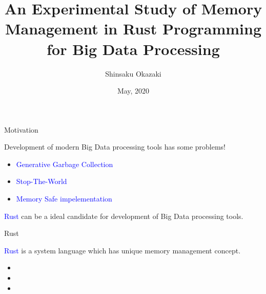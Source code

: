 \documentclass[9pt]{beamer}
\title[]{An Experimental Study of Memory Management in Rust Programming for Big Data Processing}
\date{May, 2020}
\author[Shinsaku Okazaki]{Shinsaku Okazaki}
\institute{Boston University}
\begin{document}
\maketitle








\begin{frame}[fragile]{Motivation}

Development of modern Big Data processing tools has some problems!

\begin{itemize}

  \item \textcolor{blue}{Generative Garbage Collection}
  \item \textcolor{blue}{Stop-The-World}
  \item \textcolor{blue}{Memory Safe impelementation}
\end{itemize}

\textcolor{blue}{Rust} can be a ideal candidate for development of Big Data processing tools.



\end{frame}



\begin{frame}[t, fragile]{Rust}

    \textcolor{blue}{Rust} is a system language which has unique memory management concept.

    \begin{itemize}
        \item {}
        \item {}
        \item {}
    \end{itemize}
\end{frame}
\end{document}
